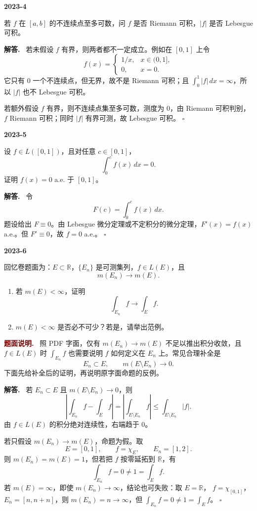 \documentclass[UTF8]{ctexart}
\newcommand{\R}{\mathbb R}
\newenvironment{problem}[1]{\par\medskip\noindent\textbf{#1}\par\smallskip}{\par}
\newenvironment{solution}{\par\noindent\textbf{解答.}\ }{\hfill$\square$\par\medskip}
\newenvironment{noteenv}{\par\noindent\textcolor{Maroon}{\textbf{题面说明.}}\ }{\par\smallskip}
\begin{document}
\begin{problem}{2023-4}
若 \(f\) 在 \([a,b]\) 的不连续点至多可数，问 \(f\) 是否 Riemann 可积，\(|f|\) 是否 Lebesgue 可积。
\end{problem}
\begin{solution}
若未假设 \(f\) 有界，则两者都不一定成立。例如在 \([0,1]\) 上令
\[
  f(x)=
  \begin{cases}
    1/x, & x\in(0,1],\\
    0, & x=0.
  \end{cases}
\]
它只有 \(0\) 一个不连续点，但无界，故不是 Riemann 可积；且
\(\int_0^1 |f|\,dx=\infty\)，所以 \(|f|\) 也不 Lebesgue 可积。

若额外假设 \(f\) 有界，则不连续点集至多可数，测度为 \(0\)，由 Riemann 可积判别，\(f\) Riemann 可积；同时 \(|f|\) 有界可测，故 Lebesgue 可积。
\end{solution}

\begin{problem}{2023-5}
设 \(f\in L([0,1])\)，且对任意 \(c\in[0,1]\)，
\[
  \int_0^c f(x)\,dx=0.
\]
证明 \(f(x)=0\) a.e. 于 \([0,1]\)。
\end{problem}
\begin{solution}
令
\[
  F(c)=\int_0^c f(x)\,dx.
\]
题设给出 \(F\equiv0\)。由 Lebesgue 微分定理或不定积分的微分定理，\(F'(x)=f(x)\) a.e.。但
\(F'\equiv0\)，故 \(f=0\) a.e.。
\end{solution}

\begin{problem}{2023-6}
回忆卷题面为：\(E\subset\R\)，\(\{E_n\}\) 是可测集列，\(f\in L(E)\)，且
\[
  m(E_n)\to m(E).
\]
\begin{enumerate}[label=(\arabic*)]
  \item 若 \(m(E)<\infty\)，证明
  \[
    \int_{E_n}f\to\int_E f.
  \]
  \item \(m(E)<\infty\) 是否必不可少？若是，请举出范例。
\end{enumerate}
\end{problem}
\begin{noteenv}
照 PDF 字面，仅有 \(m(E_n)\to m(E)\) 不足以推出积分收敛，且 \(f\in L(E)\) 时
\(\int_{E_n}f\) 也需要说明 \(f\) 如何定义在 \(E_n\) 上。常见合理补全是
\[
  E_n\subset E,\qquad m(E\setminus E_n)\to0.
\]
下面先给补全后的证明，再说明原字面命题的反例。
\end{noteenv}
\begin{solution}
若 \(E_n\subset E\) 且 \(m(E\setminus E_n)\to0\)，则
\[
  \left|\int_{E_n}f-\int_E f\right|
  =\left|\int_{E\setminus E_n}f\right|
  \le \int_{E\setminus E_n}|f|.
\]
由 \(f\in L(E)\) 的积分绝对连续性，右端趋于 \(0\)。

若只假设 \(m(E_n)\to m(E)\)，命题为假。取
\[
  E=[0,1],\qquad f=\chi_E,\qquad E_n=[1,2].
\]
则 \(m(E_n)=m(E)=1\)，但若把 \(f\) 按零延拓到 \(\R\)，有
\[
  \int_{E_n}f=0\ne1=\int_E f.
\]
若 \(m(E)=\infty\)，即使 \(m(E_n)\to\infty\)，结论也可失败：取 \(E=\R\)，
\(f=\chi_{[0,1]}\)，\(E_n=[n,n+n]\)，则 \(m(E_n)=n\to\infty\)，但
\(\int_{E_n}f=0\ne1=\int_Ef\)。
\end{solution}
\end{document}
